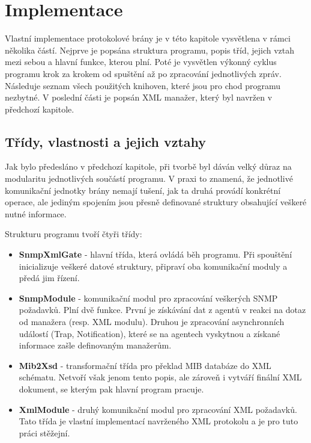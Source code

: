 \chapter{Implementace}
\label{kap_implementace}


Vlastní implementace protokolové brány je v této kapitole vysvětlena v rámci několika částí. Nejprve je popsána
struktura programu, popis tříd, jejich vztah mezi sebou a hlavní funkce, kterou plní. Poté je
vysvětlen výkonný cyklus programu krok za krokem od spuštění až po zpracování jednotlivých zpráv. Následuje seznam všech
použitých knihoven, které jsou pro chod programu nezbytné. V poslední části
je popsán XML manažer, který byl navržen v předchozí kapitole.

\section{Třídy, vlastnosti a jejich vztahy}
Jak bylo předesláno v předchozí kapitole, při tvorbě byl dáván velký důraz na modularitu jednotlivých součástí programu.
V praxi to znamená, že jednotlivé komunikační jednotky brány nemají tušení, jak ta druhá provádí konkrétní
operace, ale jediným spojením jsou přesně definované struktury obsahující veškeré nutné informace.

Strukturu programu tvoří čtyři třídy:
\begin{itemize}
	\item \textbf{SnmpXmlGate} - hlavní třída, která ovládá běh programu. Při spouštění inicializuje veškeré datové struktury,
	připraví oba komunikační moduly a předá jim řízení.
	\item \textbf{SnmpModule}  - komunikační modul pro zpracování veškerých SNMP požadavků. Plní dvě funkce. První je získávání dat
	z agentů v reakci na dotaz od manažera (resp. XML modulu). Druhou je zpracování asynchronních událostí (Trap, Notification), které
	se na agentech vyskytnou a získané informace zašle definovaným manažerům.
	\item \textbf{Mib2Xsd}	   - transformační třída pro překlad MIB databáze do XML schématu. Netvoří však jenom tento popis, ale zároveň 
	i vytváří finální XML dokument, se kterým pak hlavní program pracuje.
	\item \textbf{XmlModule}   - druhý komunikační modul pro zpracování XML požadavků. Tato třída je vlastní implementací
	navrženého XML protokolu a je pro tuto práci stěžejní.
\end{itemize}

